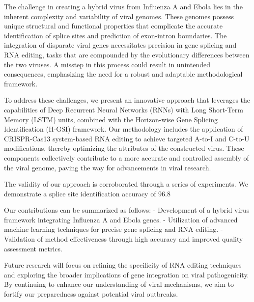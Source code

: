 \documentclass{article}
\begin{document}
The challenge in creating a hybrid virus from Influenza A and Ebola lies in the inherent complexity and variability of viral genomes. These genomes possess unique structural and functional properties that complicate the accurate identification of splice sites and prediction of exon-intron boundaries. The integration of disparate viral genes necessitates precision in gene splicing and RNA editing, tasks that are compounded by the evolutionary differences between the two viruses. A misstep in this process could result in unintended consequences, emphasizing the need for a robust and adaptable methodological framework.

To address these challenges, we present an innovative approach that leverages the capabilities of Deep Recurrent Neural Networks (RNNs) with Long Short-Term Memory (LSTM) units, combined with the Horizon-wise Gene Splicing Identification (H-GSI) framework. Our methodology includes the application of CRISPR-Cas13 system-based RNA editing to achieve targeted A-to-I and C-to-U modifications, thereby optimizing the attributes of the constructed virus. These components collectively contribute to a more accurate and controlled assembly of the viral genome, paving the way for advancements in viral research.

The validity of our approach is corroborated through a series of experiments. We demonstrate a splice site identification accuracy of 96.8%

Our contributions can be summarized as follows:
- Development of a hybrid virus framework integrating Influenza A and Ebola genes.
- Utilization of advanced machine learning techniques for precise gene splicing and RNA editing.
- Validation of method effectiveness through high accuracy and improved quality assessment metrics.

Future research will focus on refining the specificity of RNA editing techniques and exploring the broader implications of gene integration on viral pathogenicity. By continuing to enhance our understanding of viral mechanisms, we aim to fortify our preparedness against potential viral outbreaks.
\end{document}
